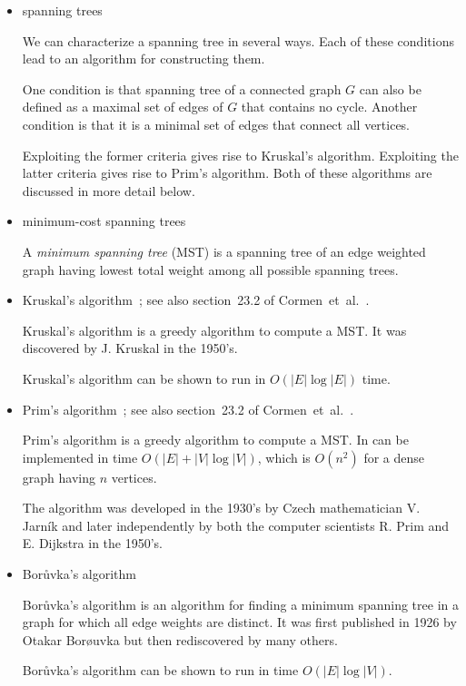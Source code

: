\begin{itemize}
\item spanning trees

We can characterize a spanning tree in several ways. Each of these
conditions lead to an algorithm for constructing them.

One condition is that spanning tree of a connected graph $G$ can also
be defined as a maximal set of edges of $G$ that contains no cycle.
Another condition is that it is a minimal set of edges that connect
all vertices.

Exploiting the former criteria gives rise to Kruskal's algorithm.
Exploiting the latter criteria gives rise to Prim's algorithm.
Both of these algorithms are discussed in more detail below.

\item minimum-cost spanning trees

A {\it minimum spanning tree} (MST) is a spanning
tree of an edge weighted graph having lowest total weight
among all possible spanning trees.

\item Kruskal's algorithm~\cite{Kruskal1956}; see also section~23.2 of
  Cormen~et~al.~\cite{CormenEtAl2001}.

Kruskal's algorithm is a greedy algorithm to compute a MST.
It was discovered by J. Kruskal in the 1950's.

Kruskal's algorithm can be shown to run in $O(|E| \log |E|)$ time.


\item Prim's algorithm~\cite{Prim1957}; see also section~23.2 of
  Cormen~et~al.~\cite{CormenEtAl2001}.

Prim's algorithm is a greedy algorithm to compute a MST. In can be
implemented in time $O(|E| + |V| \log |V|)$, which is
$O(n^2)$ for a dense graph having $n$ vertices.

The algorithm was developed in the 1930's by Czech mathematician V.
Jarn\'ik and later independently by both the computer scientists R. Prim
and E. Dijkstra in the 1950's.

\item Bor\r{u}vka's algorithm~\cite{Boruvka1926a,Boruvka1926b}

Bor\r{u}vka's algorithm is an algorithm for finding a minimum spanning
tree in a graph
for which all edge weights are distinct.
It was first published in 1926 by Otakar Bor\o uvka but then
rediscovered by many others.

Bor\r{u}vka's algorithm can be shown to run in time
$O(|E|\log |V|)$.


\end{itemize}

